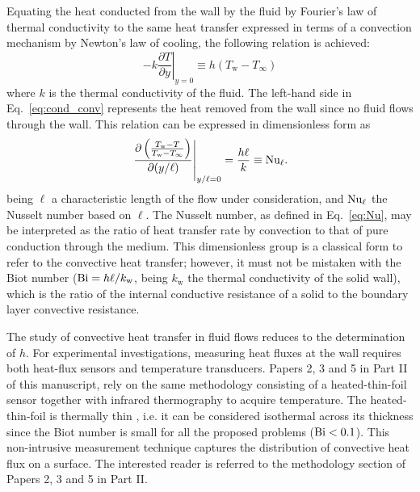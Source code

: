 Equating the heat conducted from the wall by the fluid by Fourier's law of thermal conductivity to the same heat transfer expressed in terms of a convection mechanism by Newton's law of cooling, the following relation is achieved:
\begin{equation}\label{eq:cond_conv}
    -k \left. \frac{\partial T}{\partial y} \right|_{y = 0} \equiv h(T_\mathrm{w}-T_\infty)
\end{equation}
where $k$ is the thermal conductivity of the fluid. The left-hand side in Eq.~\eqref{eq:cond_conv} represents the heat removed from the wall since no fluid flows through the wall. This relation can be expressed in dimensionless form as
\begin{equation}\label{eq:Nu}
    \left. \frac{\partial \left( \frac{T_\mathrm{w}-T}{T_\mathrm{w}-T_\infty}\right)}{\partial (y/\ell)} \right|_{y/\ell = 0} = \frac{h\ell}{k} \equiv \mbox{$\mathrm{Nu}$}_\ell.
\end{equation}
being $\ell$ a characteristic length of the flow under consideration, and $\mbox{$\mathrm{Nu}$}_\ell$ the Nusselt number based on $\ell$. The Nusselt number, as defined in Eq.~\eqref{eq:Nu}, may be interpreted as the ratio of heat transfer rate by convection to that of pure conduction through the medium. This dimensionless group is a classical form to refer to the convective heat transfer; however, it must not be mistaken with the Biot number ($\mbox{$\mathrm{Bi}$} = h\ell/k_\mathrm{w}$, being $k_\mathrm{w}$ the thermal conductivity of the solid wall), which is the ratio of the internal conductive resistance of a solid to the boundary layer convective resistance.

The study of convective heat transfer in fluid flows reduces to the determination of $h$. For experimental investigations, measuring heat fluxes at the wall requires both heat-flux sensors and temperature transducers. Papers 2, 3 and 5 in Part II of this manuscript, rely on the same methodology consisting of a heated-thin-foil sensor together with infrared thermography to acquire temperature. The heated-thin-foil is thermally thin \citep{astarita2012infrared}, i.e. it can be considered isothermal across its thickness since the Biot number is small for all the proposed problems ($\mbox{$\mathrm{Bi}$} < 0.1$). This non-intrusive measurement technique captures the distribution of convective heat flux on a surface. The interested reader is referred to the methodology section of Papers 2, 3 and 5 in Part II. 
